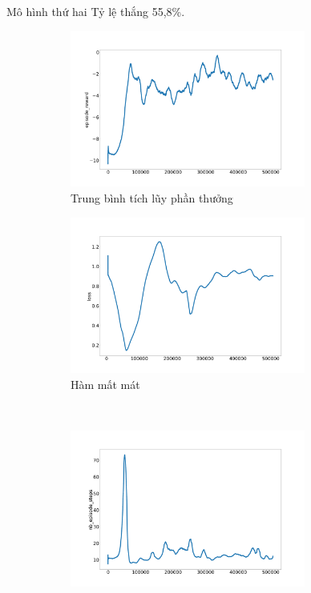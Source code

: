 \documentclass{beamer}
\begin{document}
\begin{frame}{Mô hình thứ hai}
Tỷ lệ thắng 55,8\%.
\begin{figure}[ht]
    	\centering
    	\begin{subfigure}{.5\textwidth}
    		\includegraphics[width=0.85\textwidth]{Pic/Second_model/episode_reward.png}
    		\caption{Trung bình tích lũy phần thưởng}
    		\label{fig:baseline_avg}
    	\end{subfigure}%
    	\begin{subfigure}{.5\textwidth}
    		\includegraphics[width=0.85\textwidth]{Pic/Second_model/loss.png}
    		\caption{Hàm mất mát}
    		\label{fig:baseline_loss}
    	\end{subfigure}\\
    	\begin{subfigure}{.5\textwidth}
    		\includegraphics[width=0.85\textwidth]{Pic/Second_model/nb_episode_steps.png}

\end{subfigure}
\end{figure}
\end{frame}
\end{document}
